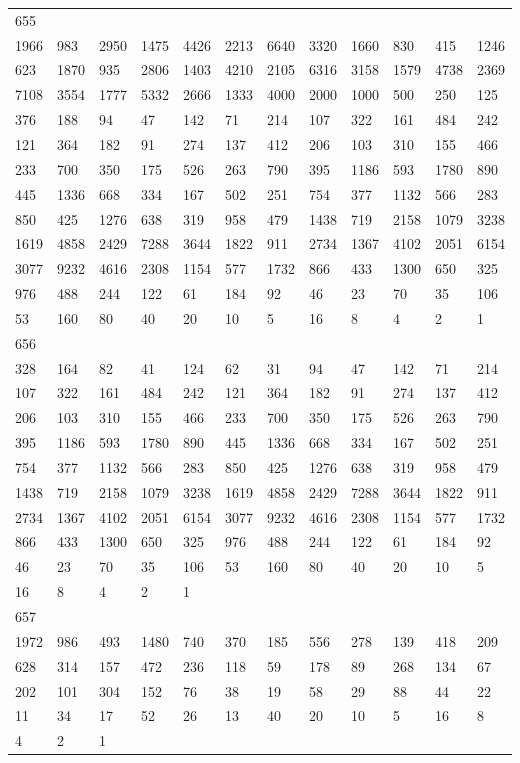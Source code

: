 \begin{longtable}{llllllllllll}
655&&&&&&&&&&&\\
1966& 983& 2950& 1475& 4426& 2213& 6640& 3320& 1660& 830& 415& 1246\\
623& 1870& 935& 2806& 1403& 4210& 2105& 6316& 3158& 1579& 4738& 2369\\
7108& 3554& 1777& 5332& 2666& 1333& 4000& 2000& 1000& 500& 250& 125\\
376& 188& 94& 47& 142& 71& 214& 107& 322& 161& 484& 242\\
121& 364& 182& 91& 274& 137& 412& 206& 103& 310& 155& 466\\
233& 700& 350& 175& 526& 263& 790& 395& 1186& 593& 1780& 890\\
445& 1336& 668& 334& 167& 502& 251& 754& 377& 1132& 566& 283\\
850& 425& 1276& 638& 319& 958& 479& 1438& 719& 2158& 1079& 3238\\
1619& 4858& 2429& 7288& 3644& 1822& 911& 2734& 1367& 4102& 2051& 6154\\
3077& 9232& 4616& 2308& 1154& 577& 1732& 866& 433& 1300& 650& 325\\
976& 488& 244& 122& 61& 184& 92& 46& 23& 70& 35& 106\\
53& 160& 80& 40& 20& 10& 5& 16& 8& 4& 2& 1\\

656&&&&&&&&&&&\\
328& 164& 82& 41& 124& 62& 31& 94& 47& 142& 71& 214\\
107& 322& 161& 484& 242& 121& 364& 182& 91& 274& 137& 412\\
206& 103& 310& 155& 466& 233& 700& 350& 175& 526& 263& 790\\
395& 1186& 593& 1780& 890& 445& 1336& 668& 334& 167& 502& 251\\
754& 377& 1132& 566& 283& 850& 425& 1276& 638& 319& 958& 479\\
1438& 719& 2158& 1079& 3238& 1619& 4858& 2429& 7288& 3644& 1822& 911\\
2734& 1367& 4102& 2051& 6154& 3077& 9232& 4616& 2308& 1154& 577& 1732\\
866& 433& 1300& 650& 325& 976& 488& 244& 122& 61& 184& 92\\
46& 23& 70& 35& 106& 53& 160& 80& 40& 20& 10& 5\\
16& 8& 4& 2& 1& \\

657&&&&&&&&&&&\\
1972& 986& 493& 1480& 740& 370& 185& 556& 278& 139& 418& 209\\
628& 314& 157& 472& 236& 118& 59& 178& 89& 268& 134& 67\\
202& 101& 304& 152& 76& 38& 19& 58& 29& 88& 44& 22\\
11& 34& 17& 52& 26& 13& 40& 20& 10& 5& 16& 8\\
4& 2& 1& \\


\end{longtable}
